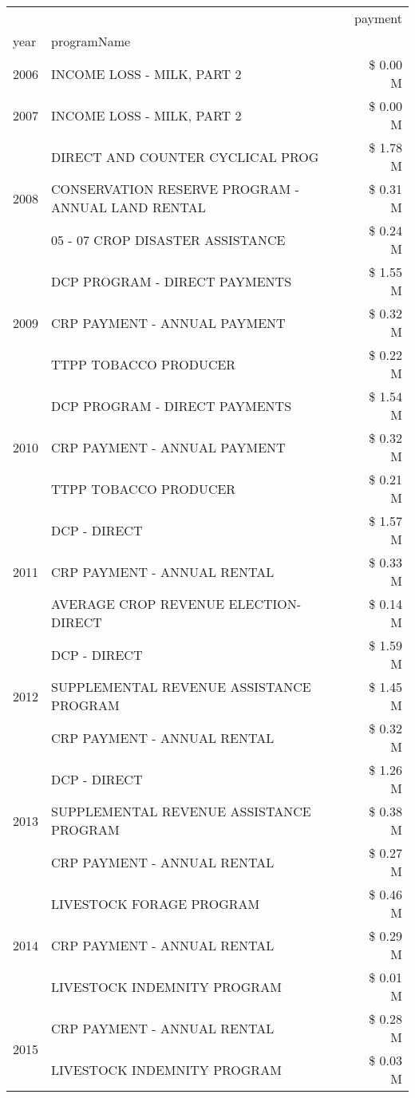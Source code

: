 \begin{tabular}{llr}
\toprule
 &  & payment \\
year & programName &  \\
\midrule
2006 & INCOME LOSS - MILK, PART 2 & \$ 0.00 M \\
\cline{1-3}
2007 & INCOME LOSS - MILK, PART 2 & \$ 0.00 M \\
\cline{1-3}
\multirow[t]{3}{*}{2008} & DIRECT AND COUNTER CYCLICAL PROG & \$ 1.78 M \\
 & CONSERVATION RESERVE PROGRAM - ANNUAL LAND RENTAL & \$ 0.31 M \\
 & 05 - 07 CROP DISASTER ASSISTANCE & \$ 0.24 M \\
\cline{1-3}
\multirow[t]{3}{*}{2009} & DCP PROGRAM - DIRECT PAYMENTS & \$ 1.55 M \\
 & CRP PAYMENT - ANNUAL PAYMENT & \$ 0.32 M \\
 & TTPP TOBACCO PRODUCER & \$ 0.22 M \\
\cline{1-3}
\multirow[t]{3}{*}{2010} & DCP PROGRAM - DIRECT PAYMENTS & \$ 1.54 M \\
 & CRP PAYMENT - ANNUAL PAYMENT & \$ 0.32 M \\
 & TTPP TOBACCO PRODUCER & \$ 0.21 M \\
\cline{1-3}
\multirow[t]{3}{*}{2011} & DCP - DIRECT & \$ 1.57 M \\
 & CRP PAYMENT - ANNUAL RENTAL & \$ 0.33 M \\
 & AVERAGE CROP REVENUE ELECTION-DIRECT & \$ 0.14 M \\
\cline{1-3}
\multirow[t]{3}{*}{2012} & DCP - DIRECT & \$ 1.59 M \\
 & SUPPLEMENTAL REVENUE ASSISTANCE PROGRAM & \$ 1.45 M \\
 & CRP PAYMENT - ANNUAL RENTAL & \$ 0.32 M \\
\cline{1-3}
\multirow[t]{3}{*}{2013} & DCP - DIRECT & \$ 1.26 M \\
 & SUPPLEMENTAL REVENUE ASSISTANCE PROGRAM & \$ 0.38 M \\
 & CRP PAYMENT - ANNUAL RENTAL & \$ 0.27 M \\
\cline{1-3}
\multirow[t]{3}{*}{2014} & LIVESTOCK FORAGE PROGRAM & \$ 0.46 M \\
 & CRP PAYMENT - ANNUAL RENTAL & \$ 0.29 M \\
 & LIVESTOCK INDEMNITY PROGRAM & \$ 0.01 M \\
\cline{1-3}
\multirow[t]{2}{*}{2015} & CRP PAYMENT - ANNUAL RENTAL & \$ 0.28 M \\
 & LIVESTOCK INDEMNITY PROGRAM & \$ 0.03 M \\

\end{tabular}

